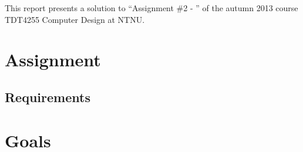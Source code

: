 This report presents a solution to ``Assignment \#2 - '' of the autumn 2013 course TDT4255 Computer Design at NTNU.

\section{Assignment}


\subsection{Requirements}


\section{Goals}

